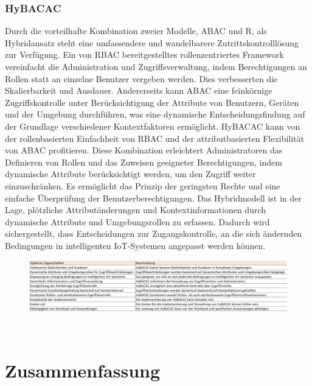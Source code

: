 \subsubsection{HyBACAC}
Durch die vorteilhafte Kombination zweier Modelle, ABAC und R, als Hybridansatz steht eine umfassendere und wandelbarere Zutrittskontrolllösung zur Verfügung.
Ein von RBAC bereitgestelltes rollenzentriertes Framework vereinfacht die Administration und Zugriffsverwaltung, indem Berechtigungen an Rollen statt an einzelne Benutzer vergeben werden. Dies verbesserten die Skalierbarkeit und Ausdauer.
Andererseits kann ABAC eine feinkörnige Zugriffskontrolle unter Berücksichtigung der Attribute von Benutzern, Geräten und der Umgebung durchführen, was eine dynamische Entscheidungsfindung auf der Grundlage verschiedener Kontextfaktoren ermöglicht.
HyBACAC kann von der rollenbasierten Einfachheit von RBAC und der attributbasierten Flexibilität von ABAC profitieren. Diese Kombination erleichtert Administratoren das Definieren von Rollen und das Zuweisen geeigneter Berechtigungen, indem dynamische Attribute berücksichtigt werden, um den Zugriff weiter einzuschränken.
Es ermöglicht das Prinzip der geringsten Rechte und eine einfache Überprüfung der Benutzerberechtigungen.
Das Hybridmodell ist in der Lage, plötzliche Attributänderungen und Kontextinformationen durch dynamische Attribute und Umgebungsrollen zu erfassen. Dadurch wird sichergestellt, dass Entscheidungen zur Zugangskontrolle, an die sich ändernden Bedingungen in intelligenten IoT-Systemen angepasst werden können\cite{ameer2022hybrid}.

\begin{figure}[h]
  \centering
 \includegraphics[scale=0.6]{resources/pic(4).png}
  \caption{}
  \label{fig:vergleich7}
\end{figure}\


\section{Zusammenfassung}

